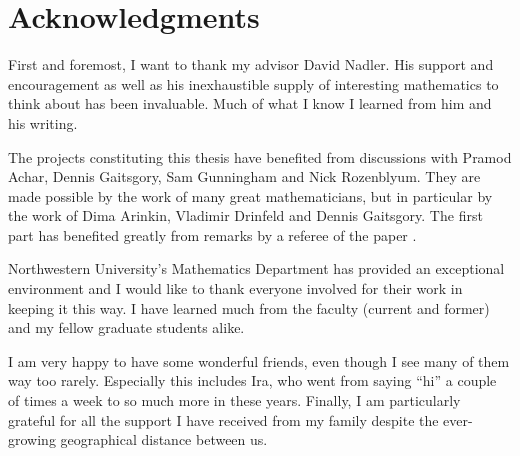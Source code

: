 \chapter*{Acknowledgments}

First and foremost, I want to thank my advisor David Nadler.
His support and encouragement as well as his inexhaustible supply of interesting mathematics to think about has been invaluable.
Much of what I know I learned from him and his writing.

The projects constituting this thesis have benefited from discussions with Pramod Achar, Dennis Gaitsgory, Sam Gunningham and Nick Rozenblyum.
They are made possible by the work of many great mathematicians, but in particular by the work of Dima Arinkin, Vladimir Drinfeld and Dennis Gaitsgory.
The first part has benefited greatly from remarks by a referee of the paper \cite{Koppensteiner:pre:ExactFunctorsOnPerverseCoherentSheaves}.

Northwestern University's Mathematics Department has provided an exceptional environment and I would like to thank everyone involved for their work in keeping it this way.
I have learned much from the faculty (current and former) and my fellow graduate students alike.

I am very happy to have some wonderful friends, even though I see many of them way too rarely.
Especially this includes Ira, who went from saying \enquote{hi} a couple of times a week to so much more in these years.
Finally, I am particularly grateful for all the support I have received from my family despite the ever-growing geographical distance between us.
